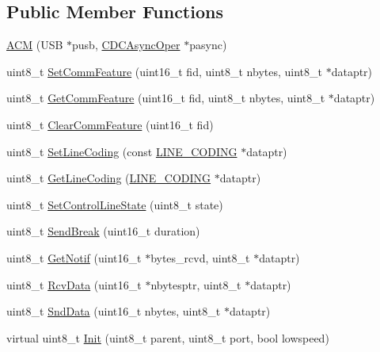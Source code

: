 \subsection*{\-Public \-Member \-Functions}
\begin{DoxyCompactItemize}
\item 
\hyperlink{class_a_c_m_aa5d83ef9d48dab404090e9136522707a}{\-A\-C\-M} (\-U\-S\-B $\ast$pusb, \hyperlink{class_c_d_c_async_oper}{\-C\-D\-C\-Async\-Oper} $\ast$pasync)
\item 
uint8\-\_\-t \hyperlink{class_a_c_m_a62c91ac62e8e3bf66bc3940d5b934c10}{\-Set\-Comm\-Feature} (uint16\-\_\-t fid, uint8\-\_\-t nbytes, uint8\-\_\-t $\ast$dataptr)
\item 
uint8\-\_\-t \hyperlink{class_a_c_m_a18208672a707391863b8abdc6714c825}{\-Get\-Comm\-Feature} (uint16\-\_\-t fid, uint8\-\_\-t nbytes, uint8\-\_\-t $\ast$dataptr)
\item 
uint8\-\_\-t \hyperlink{class_a_c_m_a74a3484a0f524ddf0e228c17addcebdf}{\-Clear\-Comm\-Feature} (uint16\-\_\-t fid)
\item 
uint8\-\_\-t \hyperlink{class_a_c_m_a79eb8706c7f1432593fb2f2eee0da504}{\-Set\-Line\-Coding} (const \hyperlink{struct_l_i_n_e___c_o_d_i_n_g}{\-L\-I\-N\-E\-\_\-\-C\-O\-D\-I\-N\-G} $\ast$dataptr)
\item 
uint8\-\_\-t \hyperlink{class_a_c_m_a9d922317b25a7ae086a6fe79984ab8d1}{\-Get\-Line\-Coding} (\hyperlink{struct_l_i_n_e___c_o_d_i_n_g}{\-L\-I\-N\-E\-\_\-\-C\-O\-D\-I\-N\-G} $\ast$dataptr)
\item 
uint8\-\_\-t \hyperlink{class_a_c_m_af2e08e5f03f17ed039985147a7129bbd}{\-Set\-Control\-Line\-State} (uint8\-\_\-t state)
\item 
uint8\-\_\-t \hyperlink{class_a_c_m_a2a618cbff52737740e76977db557ddff}{\-Send\-Break} (uint16\-\_\-t duration)
\item 
uint8\-\_\-t \hyperlink{class_a_c_m_a4deddfbfb1d9010b71096cbfd46b2dfb}{\-Get\-Notif} (uint16\-\_\-t $\ast$bytes\-\_\-rcvd, uint8\-\_\-t $\ast$dataptr)
\item 
uint8\-\_\-t \hyperlink{class_a_c_m_a7f455b7a649522c29f2e63d668b0ccca}{\-Rcv\-Data} (uint16\-\_\-t $\ast$nbytesptr, uint8\-\_\-t $\ast$dataptr)
\item 
uint8\-\_\-t \hyperlink{class_a_c_m_ac96caeb8d657fa76219872ceb4379923}{\-Snd\-Data} (uint16\-\_\-t nbytes, uint8\-\_\-t $\ast$dataptr)
\item 
virtual uint8\-\_\-t \hyperlink{class_a_c_m_ad3210651d58c77d3ded4b4b83a9476b7}{\-Init} (uint8\-\_\-t parent, uint8\-\_\-t port, bool lowspeed)

\end{DoxyCompactItemize}
